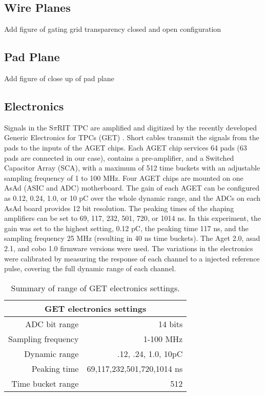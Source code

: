 \subsection{Wire Planes}
Add figure of gating grid transparency closed and open configuration 


\subsection{Pad Plane}
Add figure of close up of pad plane 

\subsection{Electronics}

Signals in the S$\pi$RIT TPC are amplified and digitized by the recently developed Generic Electronics for TPCs (GET) \cite{get}.  Short cables transmit the signals from the pads to the inputs of the AGET chips. Each AGET chip services 64 pads (63 pads are connected in our case), contains a pre-amplifier, and a Switched Capacitor Array (SCA), with a maximum of 512 time buckets with an adjustable sampling frequency of 1 to 100 MHz. Four AGET chips are mounted on one AsAd (ASIC and ADC) motherboard. The gain of each AGET can be configured as 0.12, 0.24, 1.0, or 10 pC over the whole dynamic range, and the ADCs on each AsAd board provides 12 bit resolution. The peaking times of the shaping amplifiers can be set to 69, 117, 232, 501, 720, or 1014 ns. In this experiment, the gain was set to the highest setting, 0.12 pC, the peaking time 117 ns, and the sampling frequency 25 MHz (resulting in 40 ns time buckets). The Aget 2.0, asad 2.1, and cobo 1.0 firmware versions were used. The variations in the electronics were calibrated by measuring the response of each channel to a injected reference pulse, covering the full dynamic range of each channel. 




\begin{table*}\centering
{}
\begin{tabular}{@{}rr@{}}\toprule 
\multicolumn{2}{c}{GET electronics settings}\\
\midrule
ADC bit range       & 14 bits \\
Sampling frequency  & 1-100 MHz \\
Dynamic range       & .12, .24, 1.0, 10pC \\
Peaking time        & 69,117,232,501,720,1014 ns \\
Time bucket range   & 512\\
\bottomrule
\end{tabular}
\caption{Summary of range of GET electronics settings. }
\label{tb:getoverview}
\end{table*}

